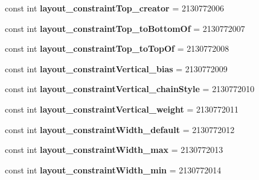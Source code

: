\begin{DoxyCompactItemize}
const int {\bfseries layout\+\_\+constraint\+Top\+\_\+creator} = 2130772006
\item 
\mbox{\label{classst_delivery_1_1_resource_1_1_attribute_a4ae2c6fefe70aec35ada404c83097aa0}} 
const int {\bfseries layout\+\_\+constraint\+Top\+\_\+to\+Bottom\+Of} = 2130772007
\item 
\mbox{\label{classst_delivery_1_1_resource_1_1_attribute_ae1be3f4655c8a80cc62acd3ed3db6bea}} 
const int {\bfseries layout\+\_\+constraint\+Top\+\_\+to\+Top\+Of} = 2130772008
\item 
\mbox{\label{classst_delivery_1_1_resource_1_1_attribute_a46bc560b7957b4bc149e1ac765c8a9dd}} 
const int {\bfseries layout\+\_\+constraint\+Vertical\+\_\+bias} = 2130772009
\item 
\mbox{\label{classst_delivery_1_1_resource_1_1_attribute_aa51c86709d2d7ea948b671cb067ef3ca}} 
const int {\bfseries layout\+\_\+constraint\+Vertical\+\_\+chain\+Style} = 2130772010
\item 
\mbox{\label{classst_delivery_1_1_resource_1_1_attribute_afefce1dde50a3c74c78afd23435b38d2}} 
const int {\bfseries layout\+\_\+constraint\+Vertical\+\_\+weight} = 2130772011
\item 
\mbox{\label{classst_delivery_1_1_resource_1_1_attribute_abe4d9b1731c72e7f9198d690b90cda4f}} 
const int {\bfseries layout\+\_\+constraint\+Width\+\_\+default} = 2130772012
\item 
\mbox{\label{classst_delivery_1_1_resource_1_1_attribute_ab37a8f296ee36584fb863e999067736f}} 
const int {\bfseries layout\+\_\+constraint\+Width\+\_\+max} = 2130772013
\item 
\mbox{\label{classst_delivery_1_1_resource_1_1_attribute_acf202ab7e50f40548402a8b05583b2b7}} 
const int {\bfseries layout\+\_\+constraint\+Width\+\_\+min} = 2130772014
\item 

\end{DoxyCompactItemize}
